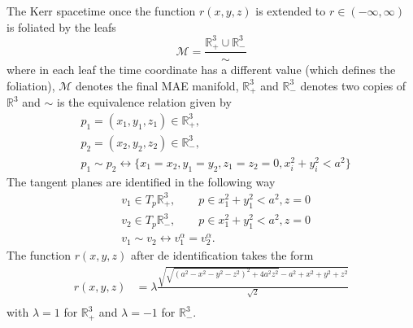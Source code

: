 \begin{proposition}
 The Kerr spacetime once the function $r(x,y,z)$ is extended to $r\in(-\infty,\infty)$ is foliated by the leafs 
 \begin{equation}
  \mathcal{M} = \frac{\mathbb{R}_+^3 \cup  \mathbb{R}_-^3}{\sim}
 \end{equation}
where in each leaf the time coordinate has a different value (which defines the foliation), $\mathcal{M}$ denotes the final \gls{MAE} manifold, $\mathbb{R}_+^3$ and $\mathbb{R}_-^3$ denotes two copies of $\mathbb{R}^3$ and $\sim$ is the equivalence relation given by
\begin{align}
 &p_1=(x_1,y_1,z_1) \in \mathbb{R}_+^3 \nonumber, \\
 &p_2=(x_2,y_2,z_2) \in \mathbb{R}_-^3 \nonumber, \\
 &p_1 \sim p_2 \longleftrightarrow \{ x_1=x_2, y_1=y_2 ,z_1=z_2=0, x_i^2+y_i^2<a^2 \}
\end{align}
The tangent planes are identified in the following way
\begin{align}
 &v_1 \in T_p\mathbb{R}_+^3,\quad \quad p \in x_1^2+y_1^2<a^2, z=0\\
 &v_2 \in T_p\mathbb{R}_-^3,\quad \quad p \in x_1^2+y_1^2<a^2, z=0\\
 &v_1 \sim v_2 \longleftrightarrow v_1^\alpha = v_2^\alpha.
\end{align}
The function $r(x,y,z)$ after de identification takes the form
\begin{align}
  r(x,y,z)&=\lambda \frac{\sqrt{\sqrt{\left(a^2-x^2-y^2-z^2\right)^2+4 a^2 z^2}-a^2+x^2+y^2+z^2}}{\sqrt{2}}\\
 \end{align}
 with $\lambda=1$ for $\mathbb{R}_+^3$ and $\lambda=-1$ for $\mathbb{R}_-^3$.
\end{proposition}
